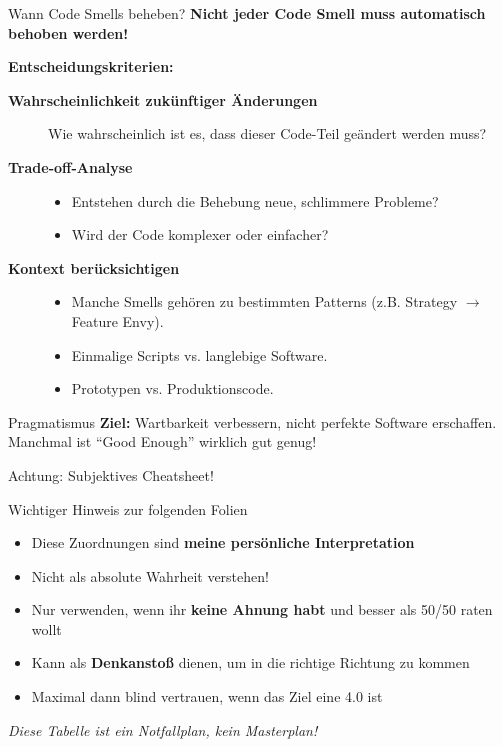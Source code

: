 \begin{frame}{Wann Code Smells beheben?}
  \textbf{Nicht jeder Code Smell muss automatisch behoben werden!}

  \textbf{Entscheidungskriterien:}
  \begin{description}
    \item[\textbf{Wahrscheinlichkeit zukünftiger Änderungen}] Wie wahrscheinlich ist es, dass dieser Code-Teil geändert werden muss?
    \item[\textbf{Trade-off-Analyse}]
      \begin{itemize}
        \item Entstehen durch die Behebung neue, schlimmere Probleme?
        \item Wird der Code komplexer oder einfacher?
      \end{itemize}
    \item[\textbf{Kontext berücksichtigen}]
      \begin{itemize}
        \item Manche Smells gehören zu bestimmten Patterns (z.B. Strategy $\rightarrow$ Feature Envy).
        \item Einmalige Scripts vs. langlebige Software.
        \item Prototypen vs. Produktionscode.
      \end{itemize}
  \end{description}

  \begin{exampleblock}{Pragmatismus}
    \textbf{Ziel:} Wartbarkeit verbessern, nicht perfekte Software erschaffen.
    Manchmal ist ``Good Enough'' wirklich gut genug!
  \end{exampleblock}
\end{frame}

\begin{frame}{Achtung: Subjektives Cheatsheet!}
  \begin{alertblock}{Wichtiger Hinweis zur folgenden Folien}
    \begin{itemize}
      \item Diese Zuordnungen sind \textbf{meine persönliche Interpretation}
      \item Nicht als absolute Wahrheit verstehen!
      \item Nur verwenden, wenn ihr \textbf{keine Ahnung habt} und besser als 50/50 raten wollt
      \item Kann als \textbf{Denkanstoß} dienen, um in die richtige Richtung zu kommen
      \item Maximal dann blind vertrauen, wenn das Ziel eine 4.0 ist
    \end{itemize}
  \end{alertblock}

  \vspace{0.5cm}
  \begin{center}
    \textit{Diese Tabelle ist ein Notfallplan, kein Masterplan!}
  \end{center}
\end{frame}

